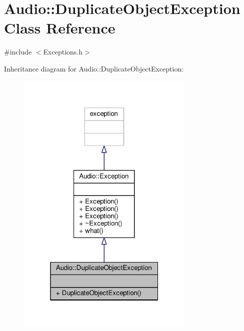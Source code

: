 \hypertarget{classAudio_1_1DuplicateObjectException}{}\section{Audio\+:\+:Duplicate\+Object\+Exception Class Reference}
\label{classAudio_1_1DuplicateObjectException}


{\ttfamily \#include $<$Exceptions.\+h$>$}



Inheritance diagram for Audio\+:\+:Duplicate\+Object\+Exception\+:
\nopagebreak
\begin{figure}[H]
\begin{center}
\leavevmode
\includegraphics[width=241pt]{d4/dc2/classAudio_1_1DuplicateObjectException__inherit__graph}
\end{center}
\end{figure}


